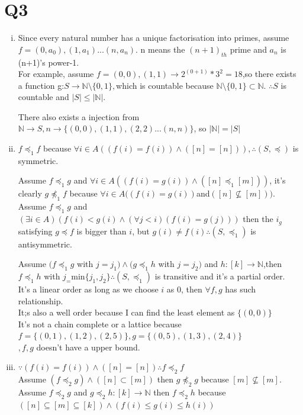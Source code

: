 \documentclass[12pt]{article}
\begin{document}
\section{Q3}
\begin{enumerate}[(i)]
\item Since every natural number has a unique factorisation into primes, assume $f={(0,a_0),(1,a_1)...(n,a_n)}$. n means the $(n+1)_{th}$ prime and $a_n$ is (n+1)'s power-1.
\\For example, assume $f={(0,0),(1,1)}\rightarrow 2^{(0+1)}*3^2=18$,so there exists a function g:$S\rightarrow\mathbb{N}\setminus\{0,1\},$which is countable because $\mathbb{N}\setminus\{0,1\}\subset\mathbb{N}$.
$\therefore S$ is countable and $|S|\leq|\mathbb{N}|$.
\par There also exists a injection from $\mathbb{N}\rightarrow S,n\rightarrow\{(0,0),(1,1),(2,2)...(n,n)\}$, so $|\mathbb{N}|=|S|$  
\item $f\preceq_1 f$ because $\forall i\in A((f(i)=f(i))\wedge([n]=[n])),\therefore (S,\preceq)$ is symmetric.
\par Assume $f\preceq_1 g$ and $\forall i\in A((f(i)=g(i))\wedge([n]\preceq_1[m]))$, it's clearly $g\npreceq_1 f$ because $\forall i\in A((f(i)=g(i))$and$([n]\nsubseteq[m]))$.
\\Assume $f\preceq_1 g$ and $(\exists i\in A)(f(i)<g(i)\wedge(\forall j<i)(f(i)=g(j)))$ then the $i_g$ satisfying $g\preceq f$ is bigger than $i$, but $g(i)\neq f(i)\therefore (S,\preceq_1)$ is antisymmetric.
\par Assume $(f\preceq_1 g$ with $j=j_1)\wedge(g\preceq_1 h$ with $j=j_2)$ and $h:[k]\rightarrow \mathbb{N}$,then$f\preceq_1 h$ with $j_=$min$\{j_1,j_2\}\therefore(S,\preceq_1)$ is transitive and it's a partial order.
\\It's a linear order as long as we choose $i$ as 0, then $\forall f,g$ has such relationship.
\\It;s also a well order because I can find the least element as $\{(0,0)\}$
\\It's not a chain complete or a lattice because $f=\{(0,1),(1,2),(2,5)\},g=\{(0,5),(1,3),(2,4)\}$\\$,{f,g}$ doesn't have a upper bound.
\item$\because (f(i)=f(i))\wedge ([n]=[n])\therefore f\preceq_2 f$
\\Assume $(f\preceq_2 g)\wedge([n]\subset[m])$ then $g\npreceq_2 g$ because $[m]\nsubseteq[m]$.
\\Assume $f\preceq_2 g$ and $g\preceq_2 h:[k]\rightarrow \mathbb{N}$ then $f\preceq_2 h$ because $([n]\subseteq[m]\subseteq[k])\wedge(f(i)\leq g(i)\leq h(i))$

\end{enumerate}
\end{document}
